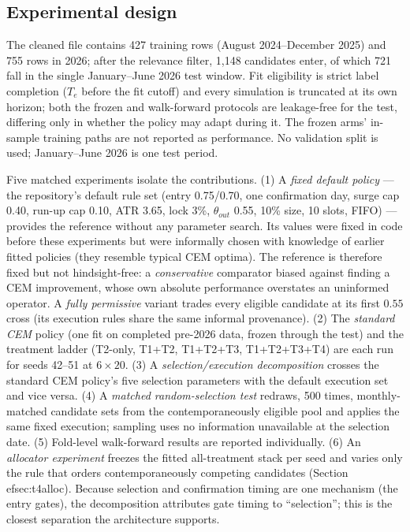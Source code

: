 \documentclass[sigconf,anonymous]{acmart}
\begin{document}
\subsection{Experimental design}
\label{sec:design}

The cleaned file contains 427 training rows (August 2024--December 2025) and 755 rows in 2026; after the relevance filter, 1,148 candidates enter, of which 721 fall in the single January--June 2026 test window. Fit eligibility is strict label completion ($T_e$ before the fit cutoff) and every simulation is truncated at its own horizon; both the frozen and walk-forward protocols are leakage-free for the test, differing only in whether the policy may adapt during it. The frozen arms' in-sample training paths are not reported as performance. No validation split is used; January--June 2026 is one test period.

Five matched experiments isolate the contributions. (1) A \emph{fixed default policy} --- the repository's default rule set (entry 0.75/0.70, one confirmation day, surge cap 0.40, run-up cap 0.10, ATR 3.65, lock 3\%, $\theta_{out}$ 0.55, 10\% size, 10 slots, FIFO) --- provides the reference without any parameter search. Its values were fixed in code before these experiments but were informally chosen with knowledge of earlier fitted policies (they resemble typical CEM optima). The reference is therefore fixed but not hindsight-free: a \emph{conservative} comparator biased against finding a CEM improvement, whose own absolute performance overstates an uninformed operator. A \emph{fully permissive} variant trades every eligible candidate at its first $0.55$ cross (its execution rules share the same informal provenance). (2) The \emph{standard CEM} policy (one fit on completed pre-2026 data, frozen through the test) and the treatment ladder (T2-only, T1+T2, T1+T2+T3, T1+T2+T3+T4) are each run for seeds 42--51 at $6\times20$. (3) A \emph{selection/execution decomposition} crosses the standard CEM policy's five selection parameters with the default execution set and vice versa. (4) A \emph{matched random-selection test} redraws, 500 times, monthly-matched candidate sets from the contemporaneously eligible pool and applies the same fixed execution; sampling uses no information unavailable at the selection date. (5) Fold-level walk-forward results are reported individually. (6) An \emph{allocator experiment} freezes the fitted all-treatment stack per seed and varies only the rule that orders contemporaneously competing candidates (Section~
ef{sec:t4alloc}). Because selection and confirmation timing are one mechanism (the entry gates), the decomposition attributes gate timing to ``selection''; this is the closest separation the architecture supports.
\end{document}
